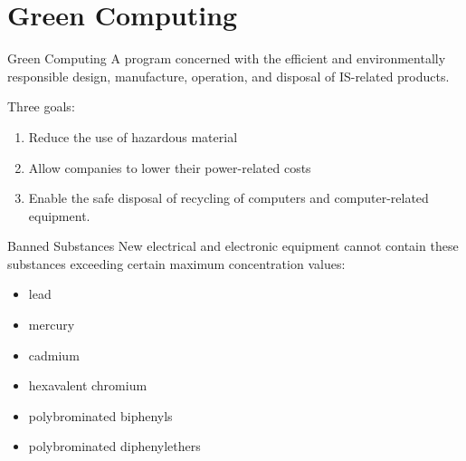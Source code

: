 \documentclass[\main/notes.tex]{subfiles}
\begin{document}
		\section{Green Computing}
			\begin{definition}{Green Computing}
				A program concerned with the efficient and environmentally responsible design, manufacture, operation, and disposal of IS-related products.

				Three goals:
				\begin{enumerate}
					\item Reduce the use of hazardous material
					\item Allow companies to lower their power-related costs
					\item Enable the safe disposal of recycling of computers and computer-related equipment.
				\end{enumerate}
			\end{definition}
			\begin{sidenote}{Banned Substances}
				New electrical and electronic equipment cannot contain these substances exceeding certain maximum concentration values:
				\begin{multicols}{2}
					\begin{itemize}[nosep]
						\item lead
						\item mercury
						\item cadmium
						\item hexavalent chromium
						\item polybrominated biphenyls
						\item polybrominated diphenylethers
					\end{itemize}
				\end{multicols}
			\end{sidenote}
\end{document}

